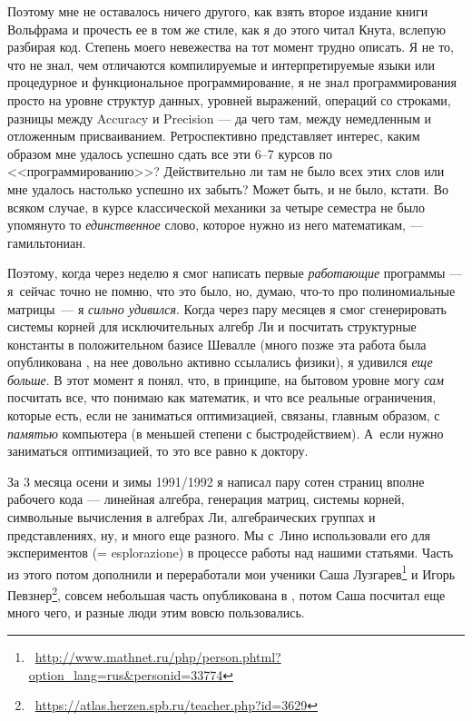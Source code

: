 \documentclass[intlimits,twoside,a4paper,11pt]{article}
\begin{document}
	Поэтому мне не оставалось ничего другого, как взять второе издание
	книги Вольфрама \cite{W88} и прочесть ее в том же стиле, как я до
	этого читал Кнута, вслепую разбирая код. Степень моего невежества 
	на тот момент трудно описать. Я не то, что не знал, чем отличаются 
	компилируемые и интерпретируемые языки или процедурное и 
	функциональное программирование, я не знал программирования
	просто на уровне структур данных, уровней выражений, операций со 
	строками, разницы между Accuracy и Precision --- да чего там, между
	немедленным и отложенным присваиванием. Ретроспективно
	представляет интерес, каким образом мне удалось успешно сдать
	все эти 6--7 курсов по <<программированию>>? Действительно ли
	там не было всех этих слов или мне удалось настолько успешно их
	забыть? Может быть, и не было, кстати. Во всяком случае, в курсе
	классической механики за четыре семестра не было упомянуто то 
	{\it единственное\/} слово, которое нужно из него математикам, ---
	гамильтониан. 
	
	Поэтому, когда через неделю я смог написать первые {\it работающие\/}
	программы --- я~сейчас точно не помню, что это было, но, думаю, 
	что-то про полиномиальные матрицы~--- я {\it сильно удивился\/}. Когда
	через пару месяцев я смог сгенерировать системы корней для
	исключительных алгебр Ли и посчитать структурные константы в
	положительном базисе Шевалле (много позже эта работа была 
	опубликована \cite{V01}, на нее довольно активно ссылались
	физики), я удивился {\it еще больше\/}. В этот момент я понял, что, в 
	принципе, на бытовом уровне могу {\it сам\/} посчитать все, что понимаю
	как математик, и что все реальные ограничения, которые есть, если не 
	заниматься оптимизацией, связаны, главным образом, с {\it памятью\/} 
	компьютера (в меньшей степени с быстродействием).
	А~если нужно заниматься оптимизацией, то это все равно к доктору.
	
	За 3 месяца осени и зимы 1991/1992 я написал пару сотен страниц 
	вполне рабочего кода --- линейная алгебра, генерация матриц, 
	системы корней, символьные вычисления в алгебрах Ли, 
	алгебраических группах и представлениях, ну, и много еще разного.
	Мы с~Лино использовали его для экспериментов (= esplorazione) в 
	процессе работы над нашими статьями. Часть из этого потом
	дополнили и переработали мои ученики 
	Саша Лузгарев\footnote{~\url{http://www.mathnet.ru/php/person.phtml?option\_lang=rus\&personid=33774}}
	и Игорь Певзнер\footnote{~\url{https://atlas.herzen.spb.ru/teacher.php?id=3629}}, 
	совсем небольшая часть опубликована в \cite{VLP, VL}, потом
	Саша посчитал еще много чего, и разные люди этим вовсю пользовались.
	
\end{document}
